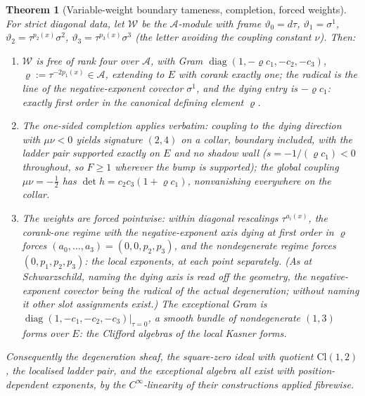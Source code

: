 \documentclass[11pt]{article}
\newtheorem{theorem}{Theorem}[section]
\theoremstyle{definition}
\newcommand{\Cl}{\mathrm{Cl}}
\newcommand{\shW}{\mathcal{W}}
\begin{document}
\begin{theorem}[Variable-weight boundary tameness, completion, forced weights]\label{thm:varexp}
For strict diagonal data, let $\shW$ be the $\mathcal{A}$-module with frame $\vartheta_0 = d\tau$, $\vartheta_1 = \sigma^1$, $\vartheta_2 = \tau^{p_2(x)}\sigma^2$, $\vartheta_3 = \tau^{p_3(x)}\sigma^3$ (the letter avoiding the coupling constant $\nu$). Then:
\begin{enumerate}
\item $\shW$ is free of rank four over $\mathcal{A}$, with Gram $\operatorname{diag}(1, -\varrho c_1, -c_2, -c_3)$, $\varrho := \tau^{-2p_1(x)} \in \mathcal{A}$, extending to $E$ with corank exactly one; the radical is the line of the negative-exponent covector $\sigma^1$, and the dying entry is $-\varrho c_1$: exactly first order in the canonical defining element $\varrho$.
\item The one-sided completion applies verbatim: coupling to the dying direction with $\mu\nu < 0$ yields signature $(2,4)$ on a collar, boundary included, with the ladder pair supported exactly on $E$ and no shadow wall ($s = -1/(\varrho c_1) < 0$ throughout, so $F \geq 1$ wherever the bump is supported); the global coupling $\mu\nu = -\tfrac12$ has $\det h = c_2c_3(1 + \varrho c_1)$, nonvanishing everywhere on the collar.
\item The weights are forced pointwise: within diagonal rescalings $\tau^{a_i(x)}$, the corank-one regime \emph{with the negative-exponent axis dying at first order in $\varrho$} forces $(a_0,\dots,a_3) = (0,0,p_2,p_3)$, and the nondegenerate regime forces $(0,p_1,p_2,p_3)$: the local exponents, at each point separately. (As at Schwarzschild, naming the dying axis is read off the geometry, the negative-exponent covector being the radical of the actual degeneration; without naming it other slot assignments exist.) The exceptional Gram is $\operatorname{diag}(1,-c_1,-c_2,-c_3)|_{\tau=0}$, a smooth bundle of nondegenerate $(1,3)$ forms over $E$: the Clifford algebras of the local Kasner forms.
\end{enumerate}
Consequently the degeneration sheaf, the square-zero ideal with quotient $\Cl(1,2)$, the localised ladder pair, and the exceptional algebra all exist with position-dependent exponents, by the $C^\infty$-linearity of their constructions applied fibrewise.
\end{theorem}
\end{document}
